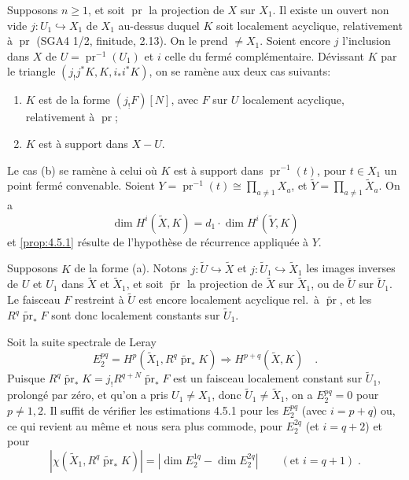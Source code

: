 \documentclass[12pt,a4paper]{article}
\theoremstyle{plain}
\theoremstyle{definition}
\newcommand{\into}{\hookrightarrow}
\providecommand{\pr}{\operatorname{pr}}
\begin{document}
Supposons $n \geq 1$, et soit $\pr$ la projection de $X$ sur $X_{1}$. Il existe un ouvert non vide $j: U_{1} \into X_{1}$ de $X_{1}$ au-dessus duquel $K$ soit localement acyclique, relativement \`{a} $\pr$ (SGA4 1/2, finitude, 2.13). On le prend $\neq X_{1}$. Soient encore $j$ l'inclusion dans $X$ de $U = \pr^{-1}(U_{1})$ et $i$ celle du ferm\'{e} compl\'{e}mentaire. D\'{e}vissant $K$ par le triangle $(j_{!}j^{*}K, K, i_{*}i^{*}K)$, on se ram\`{e}ne aux deux cas suivants:
\begin{enumerate}
\item[(a)] $K$ est de la forme $(j_{!}F)[N]$, avec $F$ sur $U$ localement acyclique, relativement \`{a} $\pr$;
\item[(b)] $K$ est \`{a} support dans $X-U$.
\end{enumerate}

Le cas (b) se ram\`{e}ne \`{a} celui o\`{u} $K$ est \`{a} support dans $\pr^{-1}(t)$, pour $t \in X_{1}$ un point ferm\'{e} convenable. Soient $Y = \pr^{-1}(t) \cong \prod_{a \neq 1} X_{a}$, et $\tilde{Y} = \prod_{a \neq 1} \tilde{X}_{a}$. On a
\[
\dim H^{i}(\tilde{X}, K) = d_{1} \cdot \dim H^{i}(\tilde{Y}, K)
\]
et \ref{prop:4.5.1} r\'{e}sulte de l'hypoth\`{e}se de r\'{e}currence appliqu\'{e}e \`{a} $Y$.

Supposons $K$ de la forme (a). Notons $j: \tilde{U} \into \tilde{X}$ et $j: \tilde{U}_{1} \into \tilde{X}_{1}$ les images inverses de $U$ et $U_{1}$ dans $\tilde{X}$ et $\tilde{X}_{1}$, et soit $\tilde{\pr}$ la projection de $\tilde{X}$ sur $\tilde{X}_{1}$, ou de $\tilde{U}$ sur $\tilde{U}_{1}$. Le faisceau $F$ restreint \`{a} $\tilde{U}$ est encore localement acyclique rel.\ \`{a} $\tilde{\pr}$, et les $R^{q}\tilde{\pr}_{*}F$ sont donc localement constants sur $\tilde{U}_{1}$.

Soit la suite spectrale de Leray
\[
E_{2}^{pq} = H^{p}(\tilde{X}_{1}, R^{q}\tilde{\pr}_{*}K) \Rightarrow H^{p+q}(\tilde{X}, K)\quad.
\]
Puisque $R^{q}\tilde{\pr}_{*}K = j_{!}R^{q+N}\tilde{\pr}_{*}F$ est un faisceau localement constant sur $\tilde{U}_{1}$, prolong\'{e} par z\'{e}ro, et qu'on a pris $U_{1} \neq X_{1}$, donc $\tilde{U}_{1} \neq \tilde{X}_{1}$, on a $E_{2}^{pq} = 0$ pour $p \neq 1, 2$. Il suffit de v\'{e}rifier les estimations 4.5.1 pour les $E_{2}^{pq}$ (avec $i = p+q$) ou, ce qui revient au m\^{e}me et nous sera plus commode, pour $E_{2}^{2q}$ (et $i = q+2$) et pour
\[
|\chi(\tilde{X}_{1}, R^{q}\tilde{\pr}_{*}K)| = |\dim E_{2}^{1q} - \dim E_{2}^{2q}| \qquad (\text{et } i = q+1)\;.
\]
\end{document}
